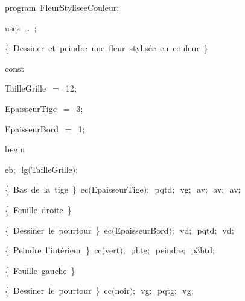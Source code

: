 
{
\parindent {}
\medskip

\carrenoir
\vspace{\neglskip}\mbox{\blc  \idt  \mcl program\idt \ FleurStyliseeCouleur$;$
}\par 
\vspace{\neglskip}\mbox{\blc \blk\idt \mcl uses\idt \ \ldots\ $;$
}\par 
\vspace{\neglskip}\mbox{\blc  \blk\idt  \cmt  \{\ Dessiner\ et\ peindre\ une\ fleur\ stylisée\ en\ couleur\ \}\idt }\par 
\pagebreak[3] 
\vspace{\neglskip}\mbox{\blc  \blk\idt  \mcl const\idt }\par 
\vspace{\neglskip}\mbox{\blc  \blk\blk\idt  TailleGrille\ $=$\ 12$;$}\par 
\vspace{\neglskip}\mbox{\blc  \blk\blk\idt  EpaisseurTige\ $=$\ 3$;$}\par 
\vspace{\neglskip}\mbox{\blc  \blk\blk\idt  EpaisseurBord\ $=$\ 1$;$}\par 
\vspace{\neglskip}\mbox{\blc  \idt  \mcl begin\idt }\par 
\vspace{\neglskip}\mbox{\blc  \blk\idt  eb$;$\ lg$($TailleGrille$)$$;$}\par 
\vspace{\neglskip}\mbox{\blc  \blk\idt  \cmt  \{\ Bas\ de\ la\ tige\ \}\idt \ ec$($EpaisseurTige$)$$;$\ pqtd$;$\ vg$;$\ av$;$\ av$;$\ av$;$\ }\par 
\vspace{\neglskip}\mbox{\blc  \blk\idt  \cmt  \{\ Feuille\ droite\ \}\idt }\par 
\vspace{\neglskip}\mbox{\blc  \blk\blk\idt  \cmt  \{\ Dessiner\ le\ pourtour\ \}\idt \ ec$($EpaisseurBord$)$$;$\ vd$;$\ pqtd$;$\ vd$;$}\par 
\vspace{\neglskip}\mbox{\blc  \blk\blk\idt  \cmt  \{\ Peindre\ l{'}intérieur\ \}\idt \ cc$($vert$)$$;$\ phtg$;$\ peindre$;$\ p3htd$;$}\par 
\vspace{\neglskip}\mbox{\blc  \blk\idt  \cmt  \{\ Feuille\ gauche\ \}\idt }\par 
\vspace{\neglskip}\mbox{\blc  \blk\blk\idt  \cmt  \{\ Dessiner\ le\ pourtour\ \}\idt \ cc$($noir$)$$;$\ vg$;$\ pqtg$;$\ vg$;$}\par 
}
